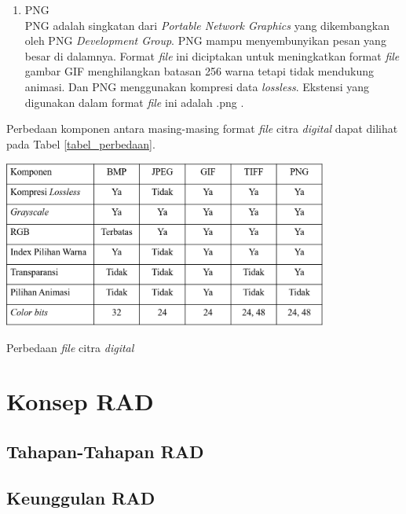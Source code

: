 \begin{enumerate}
			\item PNG\\
			PNG adalah singkatan dari \emph{Portable Network Graphics} yang dikembangkan oleh PNG \emph{Development Group}. PNG mampu menyembunyikan pesan yang besar di dalamnya. Format \emph{file} ini diciptakan untuk meningkatkan format \emph{file} gambar GIF menghilangkan batasan 256 warna tetapi tidak mendukung animasi. Dan PNG menggunakan kompresi data \emph{lossless}. Ekstensi yang digunakan dalam format \emph{file} ini adalah .png \cite{gautam}.
		\end{enumerate}
	Perbedaan komponen antara masing-masing format \emph{file} citra \emph{digital} dapat dilihat pada Tabel \ref{tabel_perbedaan}. 
	\begin{table}[H]
		\centering
		\includegraphics[width=0.8\textwidth]{gambar/table_perbedaan}
		\caption{Perbedaan \emph{file} citra \emph{digital}}
		\label{tabel_perbedaan}
	\end{table}

\section{Konsep RAD}
	\subsection{Tahapan-Tahapan RAD}
	\subsection{Keunggulan RAD}

